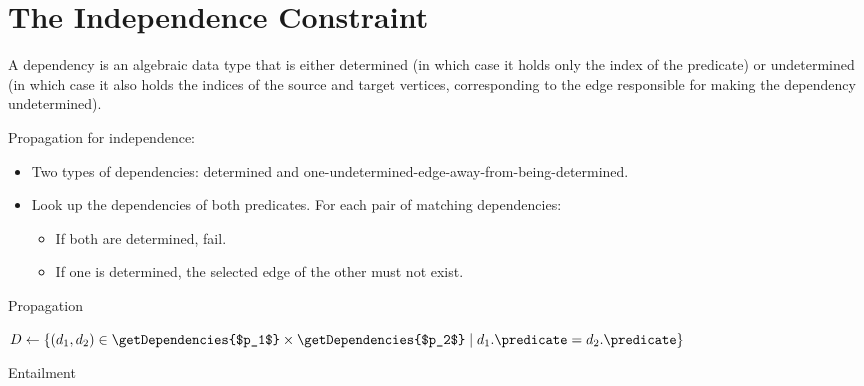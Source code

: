 \documentclass[runningheads]{llncs}
\begin{document}
\section{The Independence Constraint}

A dependency is an algebraic data type that is either determined (in which case
it holds only the index of the predicate) or undetermined (in which case it also
holds the indices of the source and target vertices, corresponding to the edge
responsible for making the dependency undetermined).

Propagation for independence:
\begin{itemize}
\item Two types of dependencies: determined and
  one-undetermined-edge-away-from-being-determined.
\item Look up the dependencies of both predicates. For each pair of
  matching dependencies:
  \begin{itemize}
  \item If both are determined, fail.
  \item If one is determined, the selected edge of the other must not
    exist.
  \end{itemize}
\end{itemize}

\begin{algorithm}
  \caption{Propagation}
\end{algorithm}

\begin{algorithm}
  $D \gets \{ (d_1, d_2) \in \getDependencies{$p_1$} \times
  \getDependencies{$p_2$} \mid d_1.\predicate = d_2.\predicate \}$\;
  \;
  \caption{Entailment}
\end{algorithm}
\end{document}
